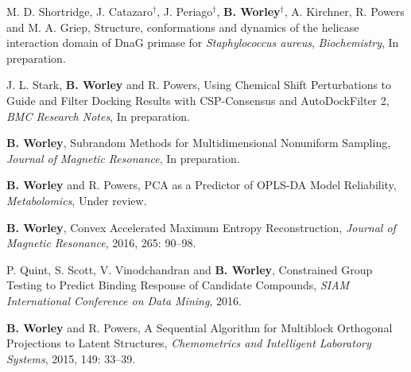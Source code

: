 \documentclass[letterpaper]{article}
\renewenvironment{itemize}{
  \begin{list}{}{
    \setlength{\leftmargin}{1.5em}
  }
}{
  \end{list}
}
\begin{document}
\begin{itemize}
\item M. D. Shortridge, J. Catazaro$^\dagger$, J. Periago$^\dagger$,
 \textbf{B. Worley}$^\dagger$, A. Kirchner, R. Powers and M. A. Griep,
 Structure, conformations and dynamics of the helicase interaction
 domain of DnaG primase for {\it Staphylococcus aureus},
 {\it Biochemistry}, In preparation.
\end{itemize}

\begin{itemize}
\item J. L. Stark, \textbf{B. Worley} and R. Powers,
 Using Chemical Shift Perturbations to Guide and Filter Docking Results
 with CSP-Consensus and AutoDockFilter 2,
 {\it BMC Research Notes}, In preparation.
\end{itemize}

\begin{itemize}
\item \textbf{B. Worley},
 Subrandom Methods for Multidimensional Nonuniform Sampling,
 {\it Journal of Magnetic Resonance}, In preparation.
\end{itemize}

\begin{itemize}
\item \textbf{B. Worley} and R. Powers,
 PCA as a Predictor of OPLS-DA Model Reliability,
 {\it Metabolomics}, Under review.
\end{itemize}

\begin{itemize}
\item \textbf{B. Worley},
 Convex Accelerated Maximum Entropy Reconstruction,
 {\it Journal of Magnetic Resonance},
 2016, 265: 90--98.
\end{itemize}

\begin{itemize}
\item P. Quint, S. Scott, V. Vinodchandran and \textbf{B. Worley},
 Constrained Group Testing to Predict Binding
 Response of Candidate Compounds,
 {\it SIAM International Conference on Data Mining}, 2016.
\end{itemize}

\begin{itemize}
\item \textbf{B. Worley} and R. Powers,
 A Sequential Algorithm for Multiblock Orthogonal
 Projections to Latent Structures,
 {\it Chemometrics and Intelligent Laboratory Systems},
 2015, 149: 33--39.
\end{itemize}
\end{document}
